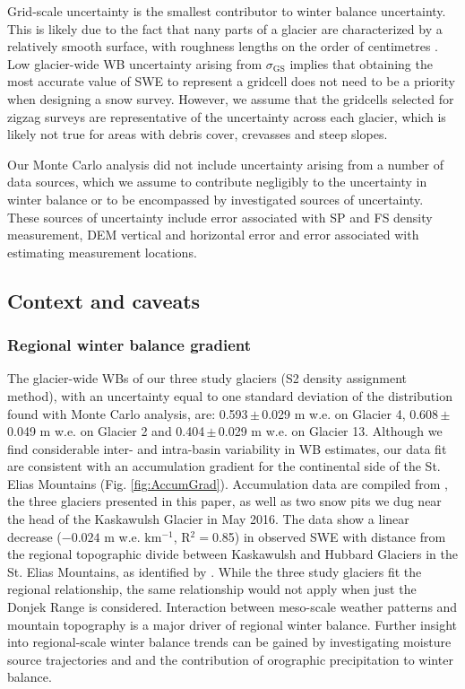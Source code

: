 \documentclass[twocolumn, letterpaper]{igs}
\begin{document}
Grid-scale uncertainty is the smallest contributor to winter balance uncertainty. This is likely due to the fact that nany parts of a glacier are characterized by a relatively smooth surface, with roughness lengths on the order of centimetres \citep[e.g.][]{Hock2005}. Low glacier-wide WB uncertainty arising from $\sigma_{\mathrm{GS}}$ implies that obtaining the most accurate value of SWE to represent a gridcell does not need to be a priority when designing a snow survey. However, we assume that the gridcells selected for zigzag surveys are representative of the uncertainty across each glacier, which is likely not true for areas with debris cover, crevasses and steep slopes.

Our Monte Carlo analysis did not include uncertainty arising from a number of data sources, which we assume to contribute negligibly to the uncertainty in winter balance or to be encompassed by investigated sources of uncertainty. These sources of uncertainty include error associated with SP and FS density measurement, DEM vertical and horizontal error and error associated with estimating measurement locations.


\subsection{Context and caveats}
\subsubsection{Regional winter balance gradient}

The glacier-wide WBs of our three study glaciers (S2 density assignment method), with an uncertainty equal to one standard deviation of the distribution found with Monte Carlo analysis, are: 0.593\,$\pm$\,0.029 m w.e. on Glacier 4, 0.608\,$\pm$\,0.049 m w.e. on Glacier 2 and 0.404\,$\pm$\,0.029 m w.e. on Glacier 13. Although we find considerable inter- and intra-basin variability in WB estimates, our data fit are consistent with an accumulation gradient for the continental side of the St. Elias Mountains (Fig. \ref{fig:AccumGrad}). Accumulation data are compiled from \cite{Taylor1969}, the three glaciers presented in this paper, as well as two snow pits we dug near the head of the Kaskawulsh Glacier in May 2016. The data show a linear decrease ($-0.024$ m w.e. km$^{-1}$, R$^2=$0.85) in observed SWE with distance from the regional topographic divide between Kaskawulsh and Hubbard Glaciers in the St. Elias Mountains, as identified by \cite{Taylor1969}. While the three study glaciers fit the regional relationship, the same relationship would not apply when just the Donjek Range is considered. Interaction between meso-scale weather patterns and mountain topography is a major driver of regional winter balance. Further insight into regional-scale winter balance trends can be gained by investigating moisture source trajectories and and the contribution of orographic precipitation to winter balance. 
\end{document}
